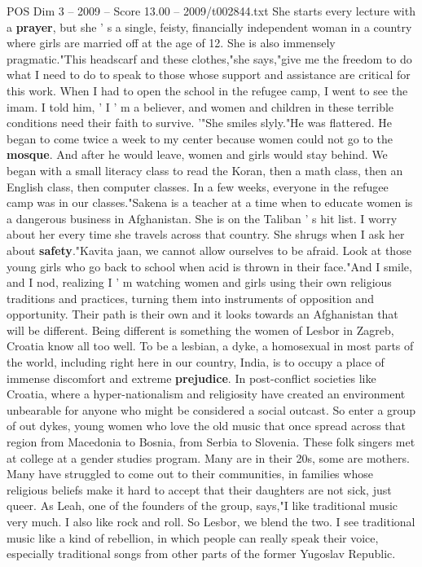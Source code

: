 \begin{textsample}{POS Dim 3 – 2009 – Score 13.00 – 2009/t002844.txt}
She starts every lecture with a \textbf{prayer}, but she ' s a single, feisty, financially independent woman in a country where girls are married off at the age of 12.
She is also immensely pragmatic."This headscarf and these clothes,"she says,"give me the freedom to do what I need to do to speak to those whose support and assistance are critical for this work.
When I had to open the school in the refugee camp, I went to see the imam.
I told him, ' I ' m a believer, and women and children in these terrible conditions need their faith to survive. '"She smiles slyly."He was flattered.
He began to come twice a week to my center because women could not go to the \textbf{mosque}.
And after he would leave, women and girls would stay behind.
We began with a small literacy class to read the Koran, then a math class, then an English class, then computer classes.
In a few weeks, everyone in the refugee camp was in our classes."Sakena is a teacher at a time when to educate women is a dangerous business in Afghanistan.
She is on the Taliban ' s hit list.
I worry about her every time she travels across that country.
She shrugs when I ask her about \textbf{safety}."Kavita jaan, we cannot allow ourselves to be afraid.
Look at those young girls who go back to school when acid is thrown in their face."And I smile, and I nod, realizing I ' m watching women and girls using their own religious traditions and practices, turning them into instruments of opposition and opportunity.
Their path is their own and it looks towards an Afghanistan that will be different.
Being different is something the women of Lesbor in Zagreb, Croatia know all too well.
To be a lesbian, a dyke, a homosexual in most parts of the world, including right here in our country, India, is to occupy a place of immense discomfort and extreme \textbf{prejudice}.
In post-conflict societies like Croatia, where a hyper-nationalism and religiosity have created an environment unbearable for anyone who might be considered a social outcast.
So enter a group of out dykes, young women who love the old music that once spread across that region from Macedonia to Bosnia, from Serbia to Slovenia.
These folk singers met at college at a gender studies program.
Many are in their 20s, some are mothers.
Many have struggled to come out to their communities, in families whose religious beliefs make it hard to accept that their daughters are not sick, just queer.
As Leah, one of the founders of the group, says,"I like traditional music very much.
I also like rock and roll.
So Lesbor, we blend the two.
I see traditional music like a kind of rebellion, in which people can really speak their voice, especially traditional songs from other parts of the former Yugoslav Republic.

\end{textsample}

